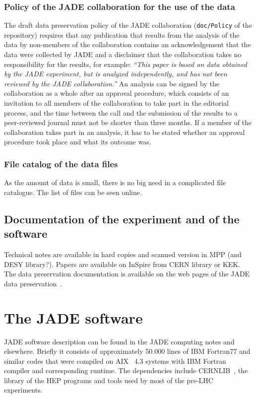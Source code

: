 \subsubsection{Policy of the JADE collaboration for the use of the data}
The draft data preservation policy of the JADE collaboration (\texttt{doc/Policy} of the repository) requires that any
publication that results from the analysis of the data by non-members of the collaboration contains an
acknowledgement that the data were collected by JADE and a disclaimer that the collaboration takes no
responsibility for the results, for example: \emph{``This paper is based on data obtained by the JADE experiment,
but is analyzed independently, and has not been reviewed by the JADE collaboration.''} An analysis can be signed by the
collaboration as a whole after an approval procedure, which consists of an invitation to all members of the
collaboration to take part in the editorial process, and the time between the call and the submission of the
results to a peer-reviewed journal must not be shorter than three months. If a member of the collaboration takes part
in an analysis, it has to be stated whether an approval procedure took place and what its outcome was.

\subsubsection{File catalog of the data files}
As the amount of data is small, there is no big need in a complicated file catalogue.
The list of files can be seen online.

\subsection{Documentation of the experiment and of the software}
Technical notes are available in hard copies and scanned version in MPP (and DESY library?).
Papers are available on InSpire from CERN library or KEK.
The data preservation documentation is available on the web pages of the JADE data preservation~\cite{JADE:web}.
\section{The JADE software}
\label{sec:software}
JADE software description can be found in the JADE computing notes and elsewhere.
Briefly it consists of approximately 50.000 lines of IBM Fortran77 and similar codes 
that were compiled on AIX~\cite{Wiki:AIX} 4.3 systems with IBM Fortran compiler and corresponding runtime.
The dependencies include CERNLIB~\cite{CERNLIB:web}, the library of the HEP programs and tools used by most of the pre-LHC experiments.

